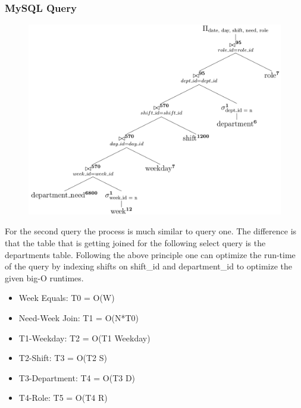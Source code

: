 \documentclass[letter,12pt]{texMemo}
\begin{document}
\subsubsection*{MySQL Query}
	
\begin{figure}[H]
	\centering
	\includegraphics[width=.75\textwidth]{query2.png}
\end{figure}
For the second query the process is much similar to query one. The difference is that the table that is getting joined for the following select query is the departments table. Following the above principle one can optimize the run-time of the query by indexing shifts on shift\_id and department\_id to optimize the given big-O runtimes.
\begin{itemize}[noitemsep,nolistsep]
	\item Week Equals: T0 = O(W)
	\item Need-Week Join: T1 = O(N*T0)
	\item T1-Weekday: T2 = O(T1 Weekday)
	\item T2-Shift: T3 = O(T2 S)
	\item T3-Department: T4 = O(T3 D)
	\item T4-Role: T5 = O(T4 R)
\end{itemize}
\end{document}
